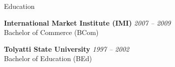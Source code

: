 \documentclass{resume} %
\begin{document}

\begin{rSection}{Education}

{\bf International Market Institute (IMI)} \hfill {{\em 2007 -- 2009\/} \\
Bachelor of Commerce (BCom)
}

{\bf Tolyatti State University} \hfill {{\em 1997 -- 2002\/} \\
Bachelor of Education (BEd)
}

\end{rSection}

\end{document}
